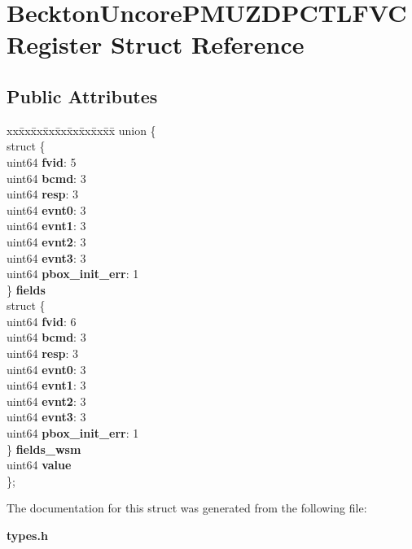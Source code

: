 \section{Beckton\+Uncore\+P\+M\+U\+Z\+D\+P\+C\+T\+L\+F\+V\+C\+Register Struct Reference}
\label{structBecktonUncorePMUZDPCTLFVCRegister}
\subsection*{Public Attributes}
\begin{DoxyCompactItemize}
\item 
\mbox{\label{structBecktonUncorePMUZDPCTLFVCRegister_a4735441d2937a41676a4816e478be001}} 
\begin{tabbing}
xx\=xx\=xx\=xx\=xx\=xx\=xx\=xx\=xx\=\kill
union \{\\
\>struct \{\\
\>\>uint64 {\bfseries fvid}: 5\\
\>\>uint64 {\bfseries bcmd}: 3\\
\>\>uint64 {\bfseries resp}: 3\\
\>\>uint64 {\bfseries evnt0}: 3\\
\>\>uint64 {\bfseries evnt1}: 3\\
\>\>uint64 {\bfseries evnt2}: 3\\
\>\>uint64 {\bfseries evnt3}: 3\\
\>\>uint64 {\bfseries pbox\_init\_err}: 1\\
\>\} {\bfseries fields}\\
\>struct \{\\
\>\>uint64 {\bfseries fvid}: 6\\
\>\>uint64 {\bfseries bcmd}: 3\\
\>\>uint64 {\bfseries resp}: 3\\
\>\>uint64 {\bfseries evnt0}: 3\\
\>\>uint64 {\bfseries evnt1}: 3\\
\>\>uint64 {\bfseries evnt2}: 3\\
\>\>uint64 {\bfseries evnt3}: 3\\
\>\>uint64 {\bfseries pbox\_init\_err}: 1\\
\>\} {\bfseries fields\_wsm}\\
\>uint64 {\bfseries value}\\
\}; \\

\end{tabbing}\end{DoxyCompactItemize}


The documentation for this struct was generated from the following file\+:\begin{DoxyCompactItemize}
\item 
\textbf{ types.\+h}\end{DoxyCompactItemize}
